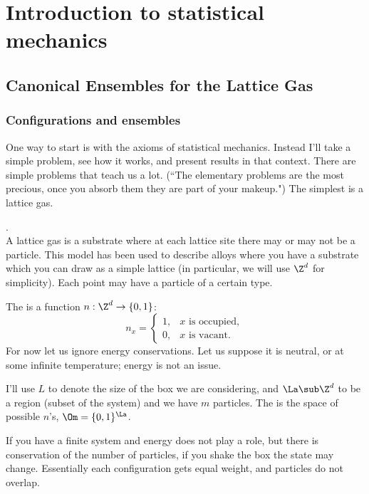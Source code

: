 \chapter{Introduction to statistical mechanics}


\section{Canonical Ensembles for the Lattice Gas}
\subsection{Configurations and ensembles}
One way to start is with the axioms of statistical mechanics. Instead I'll take a simple problem, see how it works, and present results in that context. There are simple problems that teach us a lot. (``The elementary problems are the most precious, once you absorb them they are part of your makeup.") The simplest is a lattice gas.

\begin{df} . \\
A lattice gas is a substrate where at each lattice site there may or may not be a particle. This model has been used to describe alloys where you have a substrate which you can draw as a simple lattice (in particular, we will use $\Z^d$ for simplicity). Each point may have a particle of a certain type.

The  is a function $n:\Z^d\to \{0,1\}$:
\[
n_x=\begin{cases}
1,&\text{$x$ is occupied},\\
0,&\text{$x$ is vacant}.
\end{cases}
\]
For now let us ignore energy conservations. Let us suppose it is neutral, or at some infinite temperature; energy is not an issue. 

I'll use $L$ to denote the size of the box we are considering, and $\La\sub \Z^d$ to be a region (subset of the system) and we have $m$ particles. The  is the space of possible $n$'s, $\Om = \{0,1\}^{\La}$.

If you have a finite system and energy does not play a role, but there is conservation of the number of particles, if you shake the box the state may change. Essentially each configuration gets equal weight, and particles do not overlap. 
\end{df}


